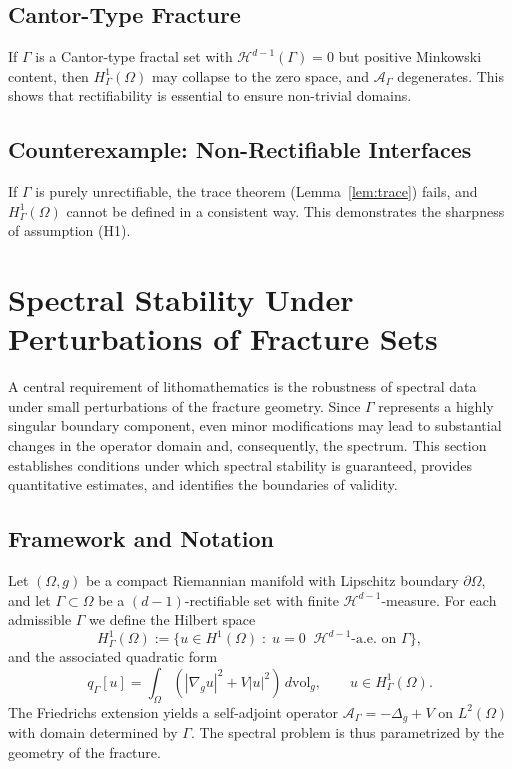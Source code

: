 \subsection{Cantor-Type Fracture}
If $\Gamma$ is a Cantor-type fractal set with $\mathcal{H}^{d-1}(\Gamma)=0$
but positive Minkowski content, then $H^1_\Gamma(\Omega)$ may collapse to the
zero space, and $\mathcal{A}_\Gamma$ degenerates. This shows that rectifiability
is essential to ensure non-trivial domains.

\subsection{Counterexample: Non-Rectifiable Interfaces}
If $\Gamma$ is purely unrectifiable, the trace theorem
(Lemma~\ref{lem:trace}) fails, and $H^1_\Gamma(\Omega)$ cannot be defined in
a consistent way. This demonstrates the sharpness of assumption (H1).

\section{Spectral Stability Under Perturbations of Fracture Sets}
\label{sec:spectral-stability}

A central requirement of lithomathematics is the robustness of spectral data
under small perturbations of the fracture geometry. Since $\Gamma$ represents
a highly singular boundary component, even minor modifications may lead to
substantial changes in the operator domain and, consequently, the spectrum.
This section establishes conditions under which spectral stability is
guaranteed, provides quantitative estimates, and identifies the boundaries of
validity.

\subsection{Framework and Notation}
Let $(\Omega,g)$ be a compact Riemannian manifold with Lipschitz boundary
$\partial\Omega$, and let $\Gamma\subset \Omega$ be a $(d-1)$-rectifiable set
with finite $\mathcal{H}^{d-1}$-measure. For each admissible $\Gamma$ we define
the Hilbert space
\[
H^1_\Gamma(\Omega) := \{ u \in H^1(\Omega) \;:\; u=0 \;\;\mathcal{H}^{d-1}\text{-a.e.\ on } \Gamma \},
\]
and the associated quadratic form
\[
q_\Gamma[u] = \int_\Omega \left( |\nabla_g u|^2 + V|u|^2 \right) \, d\mathrm{vol}_g,
\qquad u\in H^1_\Gamma(\Omega).
\]
The Friedrichs extension yields a self-adjoint operator
$\mathcal{A}_\Gamma = -\Delta_g + V$ on $L^2(\Omega)$ with domain determined by
$\Gamma$. The spectral problem is thus parametrized by the geometry of the
fracture.

